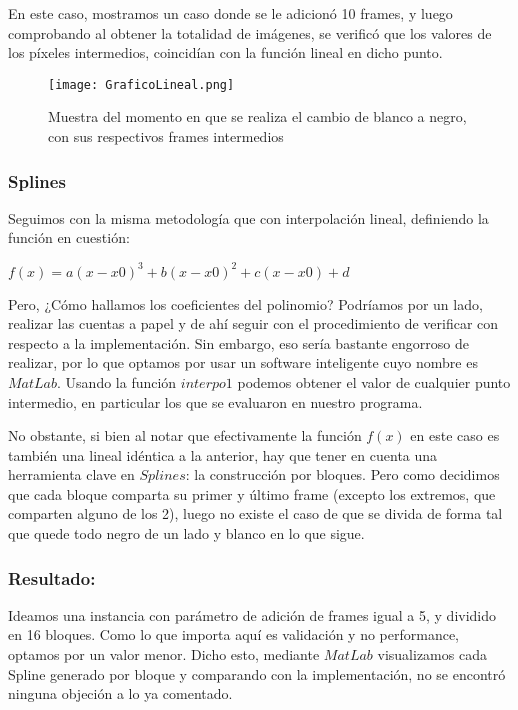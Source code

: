 En este caso, mostramos un caso donde se le adicion\'o 10 frames, y luego comprobando al obtener la totalidad de im\'agenes, se verific\'o que los valores de los p\'ixeles intermedios, coincid\'ian con la funci\'on lineal en dicho punto.


\begin{figure}[h!]
  \centering
    \texttt{[image: GraficoLineal.png]}
     \caption{Muestra del momento en que se realiza el cambio de blanco a negro, con sus respectivos frames intermedios}\label{fig:linealValidacion}
\end{figure}
\noindent

\subsubsection*{Splines}

Seguimos con la misma metodolog\'ia que con interpolaci\'on lineal, definiendo la funci\'on en cuesti\'on:

$f(x) = a (x - x0)^3 + b ( x - x0)^2 + c ( x - x0) + d$

Pero, ¿C\'omo hallamos los coeficientes del polinomio? Podr\'iamos por un lado, realizar las cuentas a papel y  de ah\'i seguir con el procedimiento de verificar con respecto a la implementaci\'on. Sin embargo, eso ser\'ia  bastante engorroso de realizar, por lo que optamos por usar un software inteligente cuyo nombre es $MatLab$. Usando la funci\'on $interpo1$ podemos obtener el valor de cualquier punto intermedio, en particular los que se evaluaron en nuestro programa.

No obstante, si bien al notar que efectivamente la funci\'on $f(x)$ en este caso es tambi\'en una lineal id\'entica a la anterior, hay que tener en cuenta una herramienta clave en $Splines$: la construcci\'on por bloques. Pero como decidimos que cada bloque comparta su primer y \'ultimo frame (excepto los extremos, que comparten alguno de los 2), luego no existe el caso de que se divida de forma tal que quede todo negro de un lado y blanco en lo que sigue.

\subsubsection*{\bf{Resultado:}}

Ideamos una instancia con par\'ametro de adici\'on de frames igual a 5, y dividido en 16 bloques. Como lo que importa aqu\'i es validaci\'on y no performance, optamos por un valor menor. Dicho esto, mediante $MatLab$ visualizamos cada Spline generado por bloque y comparando con la implementaci\'on, no se encontr\'o ninguna objeci\'on a lo ya comentado.


